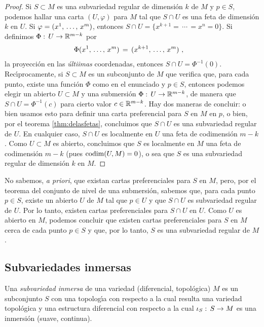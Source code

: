 \begin{proof}
	Si $S\subset M$ es una subvariedad regular de dimensi\'{o}n $k$ de $M$
	y $p\in S$, podemos hallar una carta $(U,\varphi)$ para $M$ tal que
	$S\cap U$ es una feta de dimensi\'{o}n $k$ en $U$. Si
	$\varphi=(\lista*{x}{m})$, entonces $S\cap U=%
	\{x^{k+1}=\,\cdots\,=x^{n}=0\}$. Si definimos
	$\Phi:\,U\rightarrow\bb{R}^{m-k}$ por
	\begin{align*}
		\Phi(\lista*{x}{m}) & \,=\,(x^{k+1},\,\dots,\,x^{m})
		\text{ ,}
	\end{align*}
	la proyecci\'{o}n en las \emph{\'{u}ltiimas} coordenadas, entonces
	$S\cap U=\Phi^{-1}(0)$. Rec\'{\i}procamente, si $S\subset M$ es un
	subconjunto de $M$ que verifica que, para cada punto, existe una
	funci\'{o}n $\Phi$ como en el enunciado y $p\in S$, entonces
	podemos elegir un abierto $U\subset M$ y una submersi\'{o}n
	$\Phi:\,U\rightarrow\bb{R}^{m-k}$, de manera que
	$S\cap U=\Phi^{-1}(c)$ para cierto valor $c\in \bb{R}^{m-k}$.
	Hay dos maneras de concluir: o bien usamos esto para definir una
	carta preferencial para $S$ en $M$ en $p$, o bien, por el teorema
	\ref{thm:delasfetas}, concluimos que $S\cap U$ es una subvariedad
	regular de $U$. En cualquier caso, $S\cap U$ es localmente en $U$
 	una feta de codimensi\'{o}n $m-k$. Como $U\subset M$ es abierto,
	concluimos que $S$ es localmente en $M$ una feta de codimensi\'{o}n
	$m-k$ (pues $\codim(U,M)=0$), o sea que $S$ es una subvariedad
	regular de dimensi\'{o}n $k$ en $M$.
\end{proof}

No sabemos, \textit{a priori}, que existan cartas preferenciales para $S$ en
$M$, pero, por el teorema del conjunto de nivel de una submersi\'{o}n, sabemos
que, para cada punto $p\in S$, existe un abierto $U$ de $M$ tal que
$p\in U$ y que $S\cap U$ es subvariedad regular de $U$. Por lo tanto,
existen cartas preferenciales para $S\cap U$ en $U$. Como $U$ es abierto
en $M$, podemos concluir que existen cartas preferenciales para $S$ en $M$
cerca de cada punto $p\in S$ y que, por lo tanto, $S$ es una subvariedad
regular de $M$.

\subsection{Subvariedades inmersas}
Una \emph{subvariedad inmersa} de una variedad (diferencial, topol\'{o}gica)
$M$ es un subconjunto $S$ con una topolog\'{\i}a con respecto a la cual
resulta una variedad topol\'{o}gica y una estructura diferencial con respecto
a la cual $\inc[S]:\,S\rightarrow M$ es una inmersi\'{o}n (suave, continua).

